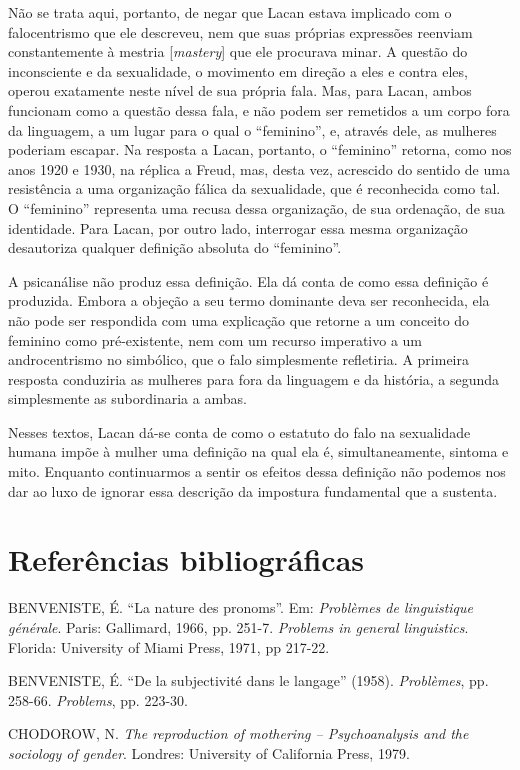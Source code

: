 Não se trata aqui, portanto, de negar que Lacan estava implicado com o
falocentrismo que ele descreveu, nem que suas próprias expressões
reenviam constantemente à mestria {[}\emph{mastery}{]} que ele procurava
minar. A questão do inconsciente e da sexualidade, o movimento em
direção a eles e contra eles, operou exatamente neste nível de sua
própria fala. Mas, para Lacan, ambos funcionam como a questão dessa
fala, e não podem ser remetidos a um corpo fora da linguagem, a um lugar
para o qual o ``feminino'', e, através dele, as mulheres poderiam
escapar. Na resposta a Lacan, portanto, o ``feminino'' retorna, como nos
anos 1920 e 1930, na réplica a Freud, mas, desta vez, acrescido do
sentido de uma resistência a uma organização fálica da sexualidade, que
é reconhecida como tal. O ``feminino'' representa uma recusa dessa
organização, de sua ordenação, de sua identidade. Para Lacan, por outro
lado, interrogar essa mesma organização desautoriza qualquer definição
absoluta do ``feminino''.

A psicanálise não produz essa definição. Ela dá conta de como essa
definição é produzida. Embora a objeção a seu termo dominante deva ser
reconhecida, ela não pode ser respondida com uma explicação que retorne
a um conceito do feminino como pré-existente, nem com um recurso
imperativo a um androcentrismo no simbólico, que o falo simplesmente
refletiria. A primeira resposta conduziria as mulheres para fora da
linguagem e da história, a segunda simplesmente as subordinaria a ambas.

Nesses textos, Lacan dá-se conta de como o estatuto do falo na
sexualidade humana impõe à mulher uma definição na qual ela é,
simultaneamente, sintoma e mito. Enquanto continuarmos a sentir os
efeitos dessa definição não podemos nos dar ao luxo de ignorar essa
descrição da impostura fundamental que a sustenta.

\section{Referências bibliográficas}

BENVENISTE, É. ``La nature des pronoms''. Em: \emph{Problèmes de
linguistique générale}. Paris: Gallimard, 1966, pp. 251-7.
\emph{Problems in general linguistics}. Florida: University of Miami
Press, 1971, pp 217-22.

BENVENISTE, É. ``De la subjectivité dans le langage'' (1958).
\emph{Problèmes}, pp. 258-66. \emph{Problems}, pp. 223-30.

CHODOROW, N. \emph{The reproduction of mothering -- Psychoanalysis and
the sociology of gender}. Londres: University of California Press,
1979.

